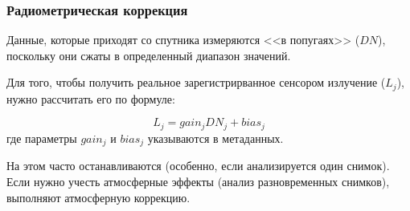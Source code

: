 
\begin{frame}
    \frametitle{Радиометрическая коррекция}
    Данные, которые приходят со спутника измеряются <<в попугаях>> ($DN$), поскольку они сжаты в определенный диапазон значений.

    Для того, чтобы получить реальное зарегистрирванное сенсором излучение ($L_j$), нужно рассчитать его по формуле:

    \begin{equation*}
        L_j = gain_j DN_j + bias_j
    \end{equation*}
    где параметры $gain_j$ и $bias_j$ указываются в метаданных.

    На этом часто останавливаются (особенно, если анализируется один снимок). Если нужно учесть атмосферные эффекты (анализ разновременных снимков), выполняют атмосферную коррекцию.
\end{frame}

